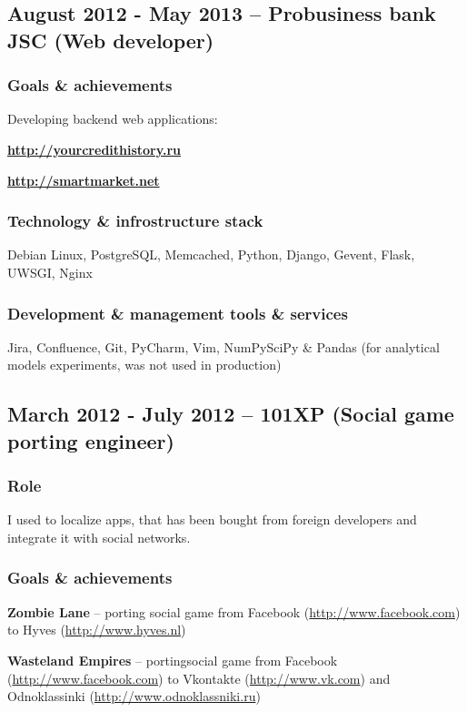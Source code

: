\documentclass[9pt, a4paper, english]{extarticle}
\begin{document}
  \subsection* {August 2012 - May 2013 -- \textbf{Probusiness bank JSC} (Web developer)}
    \subsubsection* {Goals \& achievements}
      Developing backend web applications:
      \begin {list}{\textbullet}{\itemsep=0mm}
        \item \textbf{\url{http://yourcredithistory.ru}}
        \item \textbf{\url{http://smartmarket.net}}
      \end {list}
    \subsubsection* {Technology \& infrostructure stack}
      Debian Linux, PostgreSQL, Memcached, Python, Django, Gevent, Flask,
      UWSGI, Nginx
    \subsubsection* {Development \& management tools \& services}
      Jira, Confluence, Git, PyCharm, Vim, NumPy\/SciPy \& Pandas (for
      analytical models experiments, was not used in production)


  \subsection* {March 2012 - July 2012 -- \textbf{101XP} (Social game porting engineer)}
    \subsubsection* {Role}
      I used to localize apps, that has been bought from foreign developers and
      integrate it with social networks.
    \subsubsection* {Goals \& achievements}
      \begin {list}{\textbullet}{\itemsep=0mm}
        \item \textbf{Zombie Lane} -- porting social game from Facebook
          (\url{http://www.facebook.com}) to Hyves (\url{http://www.hyves.nl})
        \item \textbf{Wasteland Empires} -- portingsocial game from Facebook
          (\url{http://www.facebook.com}) to Vkontakte
          (\url{http://www.vk.com}) and Odnoklassinki
          (\url{http://www.odnoklassniki.ru})
      \end {list}
\end{document}
